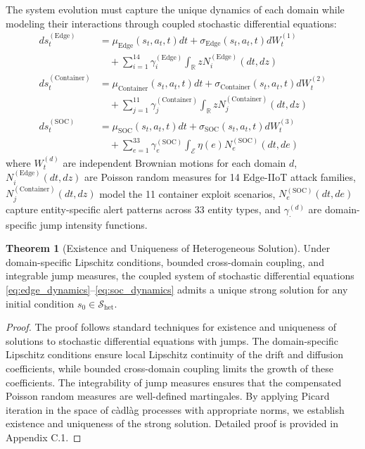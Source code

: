 \documentclass[12pt,a4paper]{article}
\theoremstyle{definition}
\newtheorem{theorem}{Theorem}[section]
\newcommand{\R}{\mathbb{R}}
\newcommand{\S}{\mathcal{S}}
\begin{document}
The system evolution must capture the unique dynamics of each domain while modeling their interactions through coupled stochastic differential equations:
\begin{align}
ds_t^{(\text{Edge})} &= \mu_{\text{Edge}}(s_t, a_t, t)dt + \sigma_{\text{Edge}}(s_t, a_t, t)dW_t^{(1)} \nonumber \\
&\quad + \sum_{i=1}^{14} \gamma_i^{(\text{Edge})} \int_{\R} z N_i^{(\text{Edge})}(dt, dz) \label{eq:edge_dynamics} \\
ds_t^{(\text{Container})} &= \mu_{\text{Container}}(s_t, a_t, t)dt + \sigma_{\text{Container}}(s_t, a_t, t)dW_t^{(2)} \nonumber \\
&\quad + \sum_{j=1}^{11} \gamma_j^{(\text{Container})} \int_{\R} z N_j^{(\text{Container})}(dt, dz) \label{eq:container_dynamics} \\
ds_t^{(\text{SOC})} &= \mu_{\text{SOC}}(s_t, a_t, t)dt + \sigma_{\text{SOC}}(s_t, a_t, t)dW_t^{(3)} \nonumber \\
&\quad + \sum_{e=1}^{33} \gamma_e^{(\text{SOC})} \int_{\mathcal{E}} \eta(e) N_e^{(\text{SOC})}(dt, de) \label{eq:soc_dynamics}
\end{align}
where $W_t^{(d)}$ are independent Brownian motions for each domain $d$, $N_i^{(\text{Edge})}(dt, dz)$ are Poisson random measures for 14 Edge-IIoT attack families, $N_j^{(\text{Container})}(dt, dz)$ model the 11 container exploit scenarios, $N_e^{(\text{SOC})}(dt, de)$ capture entity-specific alert patterns across 33 entity types, and $\gamma_{\cdot}^{(d)}$ are domain-specific jump intensity functions.

\begin{theorem}[Existence and Uniqueness of Heterogeneous Solution]
\label{thm:existence_uniqueness}
Under domain-specific Lipschitz conditions, bounded cross-domain coupling, and integrable jump measures, the coupled system of stochastic differential equations \eqref{eq:edge_dynamics}--\eqref{eq:soc_dynamics} admits a unique strong solution for any initial condition $s_0 \in \S_{\text{het}}$.
\end{theorem}

\begin{proof}
The proof follows standard techniques for existence and uniqueness of solutions to stochastic differential equations with jumps. The domain-specific Lipschitz conditions ensure local Lipschitz continuity of the drift and diffusion coefficients, while bounded cross-domain coupling limits the growth of these coefficients. The integrability of jump measures ensures that the compensated Poisson random measures are well-defined martingales. By applying Picard iteration in the space of càdlàg processes with appropriate norms, we establish existence and uniqueness of the strong solution. Detailed proof is provided in Appendix C.1.
\end{proof}
\end{document}
